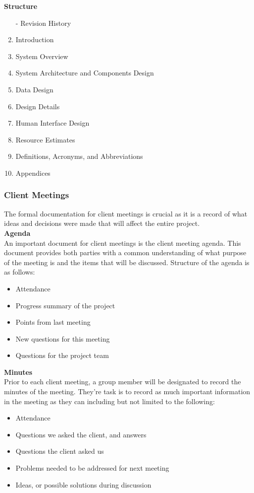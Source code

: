 \textbf{Structure}
\begin{enumerate}
	\item[-] Revision History
	\item Introduction
	\item System Overview
	\item System Architecture and Components Design
	\item Data Design
	\item Design Details
	\item Human Interface Design
	\item Resource Estimates
	\item Definitions, Acronyms, and Abbreviations
	\item Appendices
\end{enumerate}

\subsubsection{Client Meetings}
The formal documentation for client meetings is crucial as it is a record of what ideas and decisions were made that will affect the entire project. \\

\textbf{Agenda}\\
An important document for client meetings is the client meeting agenda. This document provides both parties with a common understanding of what purpose of the meeting is and the items that will be discussed. Structure of the agenda is as follows:

\begin{itemize}
	\item Attendance
	\item Progress summary of the project
	\item Points from last meeting
	\item New questions for this meeting
	\item Questions for the project team
\end{itemize}

\textbf{Minutes}\\
Prior to each client meeting, a group member will be designated to record the minutes of the meeting. They're task is to record as much important information in the meeting as they can including but not limited to the following:

\begin{itemize}
	\item Attendance
	\item Questions we asked the client, and answers
	\item Questions the client asked us
	\item Problems needed to be addressed for next meeting
	\item Ideas, or possible solutions during discussion
\end{itemize}

